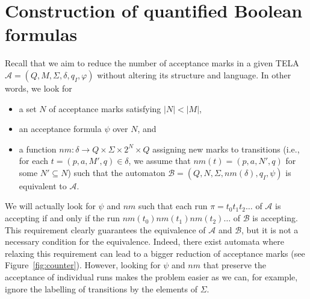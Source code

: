 \documentclass[a4paper,UKenglish,cleveref,autoref,thm-restate]{lipics-v2021}
\newcommand{\oM}{N}
\newcommand{\rem}{\mathit{nm}}
\newcommand{\mA}{\mathcal{A}}
\newcommand{\mB}{\mathcal{B}}
\begin{document}


\section{Construction of quantified Boolean formulas}\label{sec:qbf}

Recall that we aim to reduce the number of acceptance marks in a given
TELA $\mA =(Q,M,\Sigma,\delta,q_I,\varphi)$ without altering its
structure and language. In other words, we look for
\begin{itemize}
\item a set $\oM$ of acceptance marks satisfying $|\oM|<|M|$,
\item an acceptance formula $\psi$ over $\oM$, and 
\item a function
  $\rem:\delta\rightarrow Q \times \Sigma \times 2^{\oM}\times Q$
  assigning new marks to transitions (i.e., for each
  $t=(p,a,M',q)\in\delta$, we assume that $\rem(t)=(p,a,\oM',q)$ for
  some $\oM'\subseteq\oM$)
  such that the automaton $\mB=(Q,\oM,\Sigma,\rem(\delta),q_I,\psi)$
  is equivalent to $\mA$.
\end{itemize}
We will actually look for $\psi$ and $\rem$ such that each run
$\pi=t_0t_1t_2\ldots$ of $\mA$ is accepting if and only if the run
$\rem(t_0)\rem(t_1)\rem(t_2)\ldots$ of $\mB$ is accepting. This
requirement clearly guarantees the equivalence of $\mA$ and $\mB$,
but it is not a necessary condition for the equivalence. Indeed, there
exist automata where relaxing this requirement can lead to a bigger
reduction of acceptance marks (see Figure~\ref{fig:counter}). However,
looking for $\psi$ and $\rem$ that preserve the acceptance of individual
runs makes the problem easier as we can, for example, ignore the
labelling of transitions by the elements of $\Sigma$.
\end{document}
